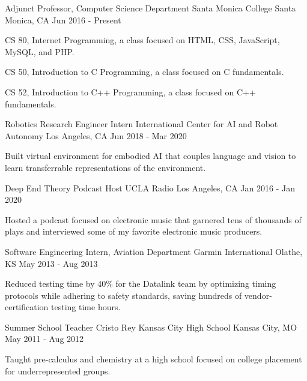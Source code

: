\cventry
{Adjunct Professor, Computer Science Department}
{Santa Monica College}
{Santa Monica, CA}
{Jun 2016 - Present}
{
\begin{cvitems}
\item CS 80, Internet Programming, a class focused on HTML, CSS, JavaScript, MySQL, and PHP.
\item CS 50, Introduction to C Programming, a class focused on C fundamentals.
\item CS 52, Introduction to C++ Programming, a class focused on C++ fundamentals.
\end{cvitems}
}


\cventry
{Robotics Research Engineer Intern}
{International Center for AI and Robot Autonomy}
{Los Angeles, CA}
{Jun 2018 - Mar 2020}
{
\begin{cvitems}
\item Built virtual environment for embodied AI that couples language and vision to learn transferrable representations of the environment.
\end{cvitems}
}


\cventry
{Deep End Theory Podcast Host}
{UCLA Radio}
{Los Angeles, CA}
{Jan 2016 - Jan 2020}
{
\begin{cvitems}
\item Hosted a podcast focused on electronic music that garnered tens of thousands of plays and interviewed some of my favorite electronic music producers.
\end{cvitems}
}


\cventry
{Software Engineering Intern, Aviation Department}
{Garmin International}
{Olathe, KS}
{May 2013 - Aug 2013}
{
\begin{cvitems}
\item Reduced testing time by 40\% for the Datalink team by optimizing timing protocols while adhering to safety standards, saving hundreds of vendor-certification testing time hours.
\end{cvitems}
}


\cventry
{Summer School Teacher}
{Cristo Rey Kansas City High School}
{Kansas City, MO}
{May 2011 - Aug 2012}
{
\begin{cvitems}
\item Taught pre-calculus and chemistry at a high school focused on college placement for underrepresented groups.
\end{cvitems}
}